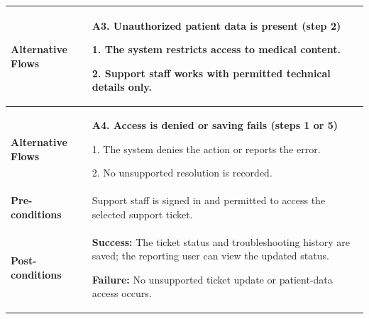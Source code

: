 \begin{longtable}{|p{}|p{}|}
\textbf{Alternative Flows} &
\textbf{A3. Unauthorized patient data is present (step 2)}\par
1. The system restricts access to medical content.\par
2. Support staff works with permitted technical details only.
\\ \hline
\textbf{Alternative Flows} &
\textbf{A4. Access is denied or saving fails (steps 1 or 5)}\par
1. The system denies the action or reports the error.\par
2. No unsupported resolution is recorded.
\\ \hline
\textbf{Pre-conditions} &
Support staff is signed in and permitted to access the selected support ticket.
\\ \hline
\textbf{Post-conditions} &
\textbf{Success:} The ticket status and troubleshooting history are saved; the reporting user can view the updated status.\par
\textbf{Failure:} No unsupported ticket update or patient-data access occurs.
\\ \hline
\end{longtable}
